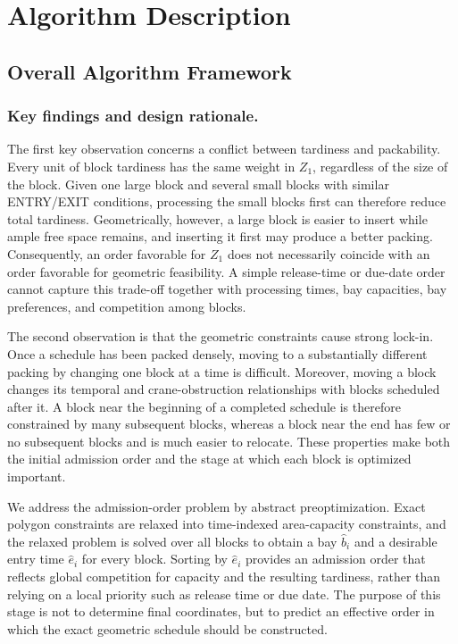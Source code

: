 \documentclass[runningheads]{llncs}
\begin{document}
\section{Algorithm Description}

\subsection{Overall Algorithm Framework}

\subsubsection{Key findings and design rationale.}
The first key observation concerns a conflict between tardiness and
packability.  Every unit of block tardiness has the same weight in $Z_1$,
regardless of the size of the block.  Given one large block and several small
blocks with similar ENTRY/EXIT conditions, processing the small blocks first
can therefore reduce total tardiness.  Geometrically, however, a large block
is easier to insert while ample free space remains, and inserting it first may
produce a better packing.  Consequently, an order favorable for $Z_1$ does
not necessarily coincide with an order favorable for geometric feasibility.
A simple release-time or due-date order cannot capture this trade-off together
with processing times, bay capacities, bay preferences, and competition among
blocks.

The second observation is that the geometric constraints cause strong
lock-in.  Once a schedule has been packed densely, moving to a substantially
different packing by changing one block at a time is difficult.  Moreover,
moving a block changes its temporal and crane-obstruction relationships with
blocks scheduled after it.  A block near the beginning of a completed
schedule is therefore constrained by many subsequent blocks, whereas a block
near the end has few or no subsequent blocks and is much easier to relocate.
These properties make both the initial admission order and the stage at which
each block is optimized important.

We address the admission-order problem by abstract preoptimization.  Exact
polygon constraints are relaxed into time-indexed area-capacity constraints,
and the relaxed problem is solved over all blocks to obtain a bay $\hat b_i$
and a desirable entry time $\hat e_i$ for every block.  Sorting by $\hat e_i$
provides an admission order that reflects global competition for capacity and
the resulting tardiness, rather than relying on a local priority such as
release time or due date.  The purpose of this stage is not to determine final
coordinates, but to predict an effective order in which the exact geometric
schedule should be constructed.
\end{document}
